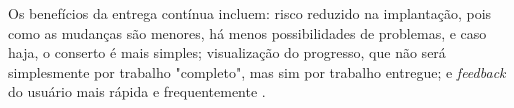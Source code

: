 Os benefícios da entrega contínua incluem: risco reduzido na implantação, pois como as mudanças são menores, há menos possibilidades de problemas, e caso haja, o conserto é mais simples; visualização do progresso, que não será simplesmente por trabalho "completo", mas sim por trabalho entregue; e \emph{feedback} do usuário mais rápida e frequentemente \cite{martin-fowler-continuous-delivery}.





